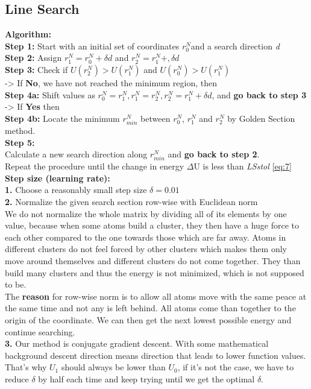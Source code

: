 \documentclass{scrartcl}
\begin{document}
\subsection{Line Search} 
\cite{alam_hinchchliffe_molecular_2003}
\textbf{Algorithm: } \\
\textbf{Step 1: } Start with an initial set of coordinates $r_{0}^{N} $and a search direction \textit{d}\\
\textbf{Step 2: } 
Assign $r_{1}^{N} = r_{0}^{N} + \delta d$ and $r_{2}^{N} = r_{1}^{N} + ,\delta d$ \\
\textbf{Step 3: } 
Check if $U(r_{2}^{N}) > U(r_{1}^{N})$ and $U(r_{0}^{N}) > U(r_{1}^{N})$ \\
-> If \textbf{No}, we have not reached the minimum region, then \\
\textbf{Step 4a: } Shift values as $r_{0}^{N} = r_{1}^{N}, r_{1}^{N} = r_{2}^{N}, r_{2}^{N} = r_{1}^{N} + \delta d$, and \textbf{go back to step 3} \\
-> If \textbf{Yes} then \\
\textbf{Step 4b: } Locate the minimum $r_{min}^{N}$ between $r_{0}^{N}$, $r_{1}^{N}$ and $r_{2}^{N}$ by Golden Section method. \\
\textbf{Step 5: } \\
Calculate a new search direction along $r_{min}^{N}$ and \textbf{go back to step 2}. \\
Repeat the procedure until the change in energy $\Delta$U is less than \textit{LSstol} \ref{eq:7} \\
\textbf{Step size (learning rate): } \\
\textbf{1. }Choose a reasonably small step size $\delta=0.01$ \\
\textbf{2. }Normalize the given search section row-wise with Euclidean norm \\
We do not normalize the whole matrix by dividing all of its elements by one value, because when some atoms build a cluster, they then have a huge force to each other compared to the one towards those which are far away. Atoms in different clusters do not feel forced by other clusters which makes them only move around themselves and different clusters do not come together. They than build many clusters and thus the energy is not minimized, which is not supposed to be. \\
The \textbf{reason} for row-wise norm is to allow all atoms move with the same peace at the same time and not any is left behind. All atoms come than together to the origin of the coordinate. We can then get the next lowest possible energy and continue searching. \\
\textbf{3. }Our method is conjugate gradient descent. With some mathematical background descent direction means direction that leads to lower function values. That's why $U_{1}$ should always be lower than $U_{0}$, if it's not the case, we have to reduce $\delta$ by half each time and keep trying until we get the optimal $\delta$.
\end{document}
